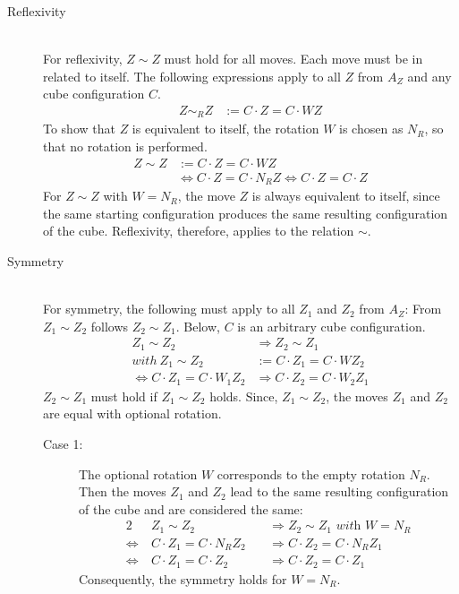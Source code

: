 \begin{description}

\item [Reflexivity] \ \\
For reflexivity, $Z \sim Z$ must hold for all moves. Each move must be in related to itself. The following expressions apply to all $Z$ from $A_Z$ and any cube configuration $C$.
\begin{align*}
Z \sim_R Z & := C \cdot Z = C \cdot WZ
\end{align*}
To show that $Z$ is equivalent to itself, the rotation $W$ is chosen as $N_R$, so that no rotation is performed.
\begin{align*}
Z \sim Z & := C \cdot Z = C \cdot WZ \\
\ & \Leftrightarrow C \cdot Z=C \cdot N_R Z \Leftrightarrow C \cdot Z = C \cdot Z
\end{align*}
For $Z \sim Z$ with $W=N_R$, the move $Z$ is always equivalent to itself, since the same starting configuration produces the same resulting configuration of the cube. Reflexivity, therefore, applies to the relation $\sim$.

\item [Symmetry] \ \\
For symmetry, the following must apply to all $Z_1$ and $Z_2$ from $A_Z$: From $Z_1 \sim Z_2$ follows $Z_2 \sim Z_1$. Below, $C$ is an arbitrary cube configuration.
\begin{align*}
Z_1 \sim Z_2 & \Rightarrow Z_2 \sim Z_1 \\
with \ Z_1 \sim Z_2 & := C \cdot Z_1 = C \cdot WZ_2 \\
\Leftrightarrow C \cdot Z_1 = C \cdot W_1 Z_2 & \Rightarrow C \cdot Z_2 = C \cdot W_2 Z_1
\end{align*}
$Z_2 \sim Z_1$ must hold if $Z_1 \sim Z_2$ holds. Since, $Z_1 \sim Z_2$, the moves $Z_1$ and $Z_2$ are equal with optional rotation.
\begin{description}

\item[Case 1:]
The optional rotation $W$ corresponds to the empty rotation $N_R$. Then the moves $Z_1$ and $Z_2$ lead to the same resulting configuration of the cube and are considered the same:
\begin{alignat*}{2}
& Z_1 \sim Z_2 && \Rightarrow Z_2 \sim Z_1 \textit{ with } W = N_R \\
\Leftrightarrow \ & C \cdot Z_1 = C \cdot N_R Z_2 \ && \Rightarrow C \cdot Z_2 = C \cdot N_R Z_1 \\
\Leftrightarrow \ & C \cdot Z_1 = C \cdot Z_2 && \Rightarrow C \cdot Z_2 = C \cdot Z_1
\end{alignat*}
Consequently, the symmetry holds for $W = N_R$.


\end{description}
\end{description}
